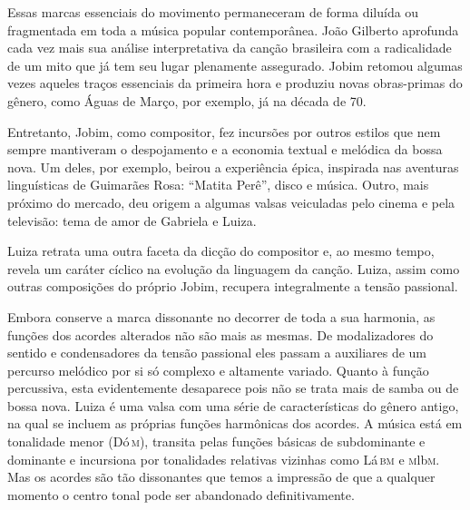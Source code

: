 Essas marcas essenciais do movimento permaneceram de forma diluída ou
fragmentada em toda a música popular contemporânea. João Gilberto
aprofunda cada vez mais sua análise interpretativa da canção brasileira
com a radicalidade de um mito que já tem seu lugar plenamente
assegurado. Jobim retomou algumas vezes aqueles traços essenciais da
primeira hora e produziu novas obras-primas do gênero, como Águas de
Março, por exemplo, já na década de 70.

Entretanto, Jobim, como compositor, fez incursões por outros estilos que
nem sempre mantiveram o despojamento e a economia textual e melódica da
bossa nova. Um deles, por exemplo, beirou a experiência épica, inspirada
nas aventuras linguísticas de Guimarães Rosa: ``Matita Perê'', disco e
música. Outro, mais próximo do mercado, deu origem a algumas valsas
veiculadas pelo cinema e pela televisão: tema de amor de Gabriela e
Luiza.











Luiza retrata uma outra faceta da dicção do compositor e, ao mesmo
tempo, revela um caráter cíclico na evolução da linguagem da canção.
Luiza, assim como outras composições do próprio Jobim, recupera
integralmente a tensão passional.

Embora conserve a marca dissonante no decorrer de toda a sua harmonia,
as funções dos acordes alterados não são mais as mesmas. De
modalizadores do sentido e condensadores da tensão passional eles passam
a auxiliares de um percurso melódico por si só complexo e altamente
variado. Quanto à função percussiva, esta evidentemente desaparece pois
não se trata mais de samba ou de bossa nova. Luiza é uma valsa com uma
série de características do gênero antigo, na qual se incluem as
próprias funções harmônicas dos acordes. A música está em tonalidade
menor (Dó\,\textsc{m}), transita pelas funções básicas de subdominante e dominante
e incursiona por tonalidades relativas vizinhas como Lá\,\textsc{bm} e \textsc{m}lb\textsc{m}. Mas os
acordes são tão dissonantes que temos a impressão de que a qualquer
momento o centro tonal pode ser abandonado definitivamente.

